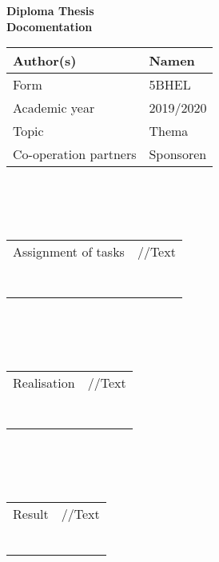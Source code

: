 \newpage

\begin{center}
	\large \textbf {Diploma Thesis \\ Docomentation} \normalsize
\end{center}

\noindent
\begin{tabularx}{\textwidth}{|m{}|X|}
	\hline
	Author(s) & Namen \\
	\hline
	Form &  5BHEL\\
	Academic year & 2019/2020\\
	\hline
	Topic& Thema\\
	\hline
	Co-operation partners & Sponsoren\\
	\hline
	
\end{tabularx}
\\
\\
\\
\noindent
\begin{tabularx}{\textwidth}{|m{}|X|}
	\hline
	Assignment of tasks & //Text \\
	&\\
	&\\
	&\\
	&\\
	&\\
	&\\
	&\\
	
	\hline
	
\end{tabularx}
\\
\\
\\
\noindent
\begin{tabularx}{\textwidth}{|m{}|X|}
	\hline
	Realisation & //Text \\
	&\\
	&\\
	&\\
	&\\
	&\\
	&\\
	&\\
	
	\hline
	
\end{tabularx}
\\
\\
\\
\noindent
\begin{tabularx}{\textwidth}{|m{}|X|}
	\hline
	Result & //Text \\
	&\\
	&\\
	&\\
	&\\
	&\\
	&\\
	
	\hline
	
\end{tabularx}
